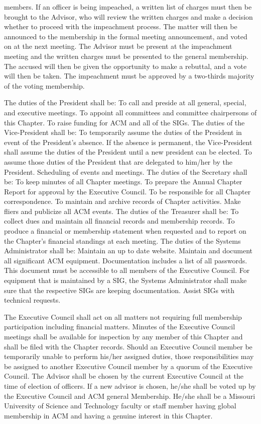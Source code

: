 \documentclass[11pt,a4paper,notitlepage]{article}
\begin{document}
members. If an officer is being impeached, a written list of charges must then
be brought to the Advisor, who will review the written charges and make a
decision whether to proceed with the impeachment process. The matter will then
be announced to the membership in the formal meeting announcement, and voted on
at the next meeting. The Advisor must be present at the impeachment meeting and
the written charges must be presented to the general membership. The accused
will then be given the opportunity to make a rebuttal, and a vote will then be
taken. The impeachment must be approved by a two-thirds majority of the voting
membership.







The duties of the President shall be: To call and preside at all general,
special, and executive meetings. To appoint all committees and committee
chairpersons of this Chapter. To raise funding for ACM and all of the SIGs. The
duties of the Vice-President shall be: To temporarily assume the duties of the
President in event of the President's absence. If the absence is permanent, the
Vice-President shall assume the duties of the President until a new president
can be elected. To assume those duties of the President that are delegated to
him/her by the President. Scheduling of events and meetings. The duties of the
Secretary shall be: To keep minutes of all Chapter meetings. To prepare the
Annual Chapter Report for approval by the Executive Council. To be responsible
for all Chapter correspondence. To maintain and archive records of Chapter
activities. Make fliers and publicize all ACM events. The duties of the
Treasurer shall be: To collect dues and maintain all financial records and
membership records. To produce a financial or membership statement when
requested and to report on the Chapter's financial standings at each meeting.
The duties of the Systems Administrator shall be: Maintain an up to date
website. Maintain and document all significant ACM equipment. Documentation
includes a list of all passwords. This document must be accessible to all
members of the Executive Council. For equipment that is maintained by a SIG, the
Systems Administrator shall make sure that the respective SIGs are keeping
documentation. Assist SIGs with technical requests. 



The Executive Council shall act on all matters not requiring full membership
participation including financial matters. Minutes of the Executive Council
meetings shall be available for inspection by any member of this Chapter and
shall be filed with the Chapter records. Should an Executive Council member be
temporarily unable to perform his/her assigned duties, those responsibilities
may be assigned to another Executive Council member by a quorum of the Executive
Council. The Advisor shall be chosen by the current Executive Council at the
time of election of officers. If a new advisor is chosen, he/she shall be voted
up by the Executive Council and ACM general Membership. He/she shall be a
Missouri University of Science and Technology faculty or staff member having
global membership in ACM and having a genuine interest in this Chapter.
\fi
\end{document}
